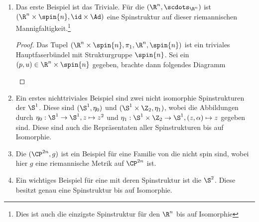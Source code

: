 \begin{Bsp}
	\begin{enumerate}[(1)]
		\item Das erste Beispiel ist das Triviale. Für die \RMF $(\R^n, \scdots_{\R^n})$ ist $(\R^n \times \spin{n},\id \times \Ad)$ 
		eine Spinstruktur auf dieser riemannischen 
		Mannigfaltigkeit.\footnote{Dies ist auch die einzigste Spinstruktur für den $ \R^n $ bis auf Isomorphie}
		\begin{proof}
			Das Tupel $ (\R^n\times \spin{n},\pi_1,\R^n,\spin{n}) $ ist ein triviales
			Hauptfaserbündel mit Strukturgruppe $ \spin{n} $.
			Sei ein $ (p,u)\in \R^n\times \spin{n} $ gegeben, brachte dann
			folgendes Diagramm
			
				\begin{center}
					
		\end{center}

		\end{proof}
		
		\item Ein erstes nichttriviales Beispiel sind zwei nicht
		isomorphie Spinstrukturen der $\S^1$. Diese sind $(\S^1 , \eta_0)$ und $(\S^1 \times \Z_2 , \eta_1)$, wobei die Abbildungen durch $\eta_0 : \S^1 \rightarrow \S^1 , z \mapsto z^2$ und $\eta_1 : \S^1 \times \Z_2 \rightarrow \S^1 , (z,\alpha) \mapsto z$ gegeben sind. Diese sind auch die Repräsentaten aller Spinstrukturen bis auf 
		Isomorphie. 
		\item Die $(\CP^{2n},g)$ ist ein Beispiel für eine Familie von
		\RMFen die nicht spin sind, wobei
		hier $g$ eine riemannische Metrik
		auf $\CP^{2n}$ ist. 
		\item Ein wichtiges Beispiel für eine \RMF mit deren Spinstruktur ist die $\S^2$. Diese
		besitzt genau eine Spinstruktur bis auf Isomorphie. 
	\end{enumerate}
\end{Bsp}






